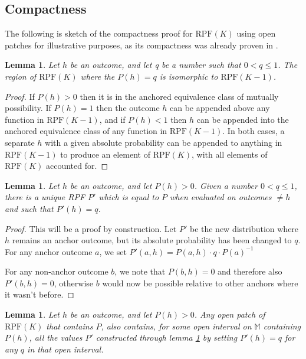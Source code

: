 \documentclass[twoside]{article}
\theoremstyle{plain}%
\newtheorem{lemma}[theorem]{Lemma}
\theoremstyle{definition}
\theoremstyle{remark}
\begin{document}
\subsection{Compactness}

The following is sketch of the compactness proof for \(\text{RPF}(K)\) using open patches for illustrative purposes, as its compactness was already proven in \cite{paper}.

\begin{lemma}
\label{lem:withhold_possible_outcome}
Let \(h\) be an outcome, and let q be a number such that \(0 < q \leq 1\). The region of \(\text{RPF}(K)\) where the \(P(h) = q\) is isomorphic to \(\text{RPF}(K-1)\).
\end{lemma}

\begin{proof}
If \(P(h) > 0\) then it is in the anchored equivalence class of mutually possibility. If \(P(h) = 1\) then the outcome \(h\) can be appended above any function in \(\text{RPF}(K - 1)\), and if \(P(h) < 1\) then \(h\) can be appended into the anchored equivalence class of any function in \(\text{RPF}(K-1)\). In both cases, a separate \(h\) with a given absolute probability can be appended to anything in \(\text{RPF}(K-1)\) to produce an element of \(\text{RPF}(K)\), with all elements of \(\text{RPF}(K)\) accounted for.
\end{proof}

\begin{lemma}
\label{lem:change_one_anchor_outcome}
Let \(h\) be an outcome, and let \(P(h) > 0\). Given a number \(0 < q \leq 1\), there is a unique RPF \(P'\) which is equal to \(P\) when evaluated on outcomes \(\neq h\) and such that \(P'(h) = q\).
\end{lemma}

\begin{proof}
This will be a proof by construction. Let \(P'\) be the new distribution where \(h\) remains an anchor outcome, but its absolute probability has been changed to \(q\). For any anchor outcome \(a\), we set \(P'(a, h) = P(a, h) \cdot q \cdot P(a)^{-1} \)

For any non-anchor outcome \(b\), we note that \(P(b, h) = 0\) and therefore also \(P'(b, h) = 0\), otherwise \(b\) would now be possible relative to other anchors where it wasn't before.
\end{proof}

\begin{lemma}
\label{lem:open_anchor_outcome}
Let \(h\) be an outcome, and let \(P(h) > 0\). Any open patch of \(\text{RPF}(K)\) that contains \(P\), also contains, for some open interval on \(\mathbb{M}\) containing \(P(h)\), all the values \(P'\) constructed through lemma \ref{lem:change_one_anchor_outcome} by setting \(P'(h) = q\) for any \(q\) in that open interval.
\end{lemma}
\end{document}
